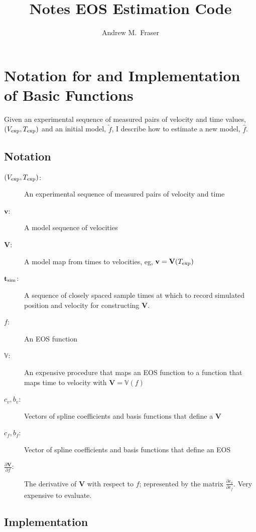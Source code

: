 \documentclass[11pt]{article}
\title{Notes EOS Estimation Code}
\author{Andrew M.\ Fraser}
\newcommand{\fnom}{\tilde f}
\newcommand{\fhat}{\hat f}
\newcommand{\partiald}[2]{\frac{\partial #1}{\partial #2}}
\newcommand\bv{\mathbf{v}}
\newcommand\Vfunc{\mathbb{V}}
\newcommand\Vt{\mathbf{V}}
\newcommand\vexp{V_{\rm{exp}}}
\newcommand\texp{T_{\rm{exp}}}
\newcommand\cf{c_f}
\newcommand\cv{c_v}
\newcommand\fbasis{b_f}
\newcommand\vbasis{b_v}
\newcommand\tsim{{\mathbf t}_{\rm{sim}}}
\newcommand\DVDf{\partiald{\Vt}{f}}
\begin{document}
\maketitle

\section{Notation for and Implementation of Basic Functions}
\label{sec:basic}


Given an experimental sequence of measured pairs of velocity and time
values, $(\vexp, \texp)$ and an initial model, $\fnom$, I describe how
to estimate a new model, $\fhat$.

\subsection{Notation}
\label{sec:basic_notation}

\begin{description}
\item[$(\vexp, \texp)$:] An experimental sequence of measured pairs of
  velocity and time
\item[$\bv$:] A model sequence of velocities
\item[$\Vt$:] A model map from  times to velocities, eg, $\bv = \Vt(\texp)$
\item[$\tsim$:] A sequence of closely spaced sample times at which to record
  simulated position and velocity for constructing $\Vt$.
\item[$f$:] An EOS function
\item[$\Vfunc$:] An expensive procedure that maps an EOS function to a
  function that maps time to velocity with $\Vt = \Vfunc(f)$
\item[$\cv,\vbasis$:] Vectors of spline coefficients and basis functions
  that define a $\Vt$
\item[$\cf,\fbasis$:] Vector of spline coefficients and basis functions
  that define an EOS
\item[$\DVDf$:] The derivative of $\Vt$ with respect to $f$;
  represented by the matrix $\partiald{\cv}{\cf}$.  Very expensive to
  evaluate.
\end{description}

\subsection{Implementation}
\label{sec:basic_implementation}
\end{document}
